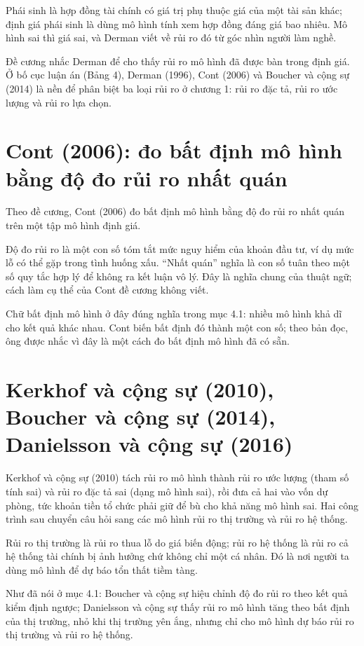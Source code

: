 Phái sinh là hợp đồng tài chính có giá trị phụ thuộc giá của một tài sản khác; định giá phái sinh là dùng mô hình tính xem hợp đồng đáng giá bao nhiêu. Mô hình sai thì giá sai, và Derman viết về rủi ro đó từ góc nhìn người làm nghề.

Đề cương nhắc Derman để cho thấy rủi ro mô hình đã được bàn trong định giá. Ở bố cục luận án (Bảng 4), Derman (1996), Cont (2006) và Boucher và cộng sự (2014) là nền để phân biệt ba loại rủi ro ở chương 1: rủi ro đặc tả, rủi ro ước lượng và rủi ro lựa chọn.

\section{Cont (2006): đo bất định mô hình bằng độ đo rủi ro nhất quán}

Theo đề cương, Cont (2006) đo bất định mô hình bằng độ đo rủi ro nhất quán trên một tập mô hình định giá.

Độ đo rủi ro là một con số tóm tắt mức nguy hiểm của khoản đầu tư, ví dụ mức lỗ có thể gặp trong tình huống xấu. “Nhất quán” nghĩa là con số tuân theo một số quy tắc hợp lý để không ra kết luận vô lý. Đây là nghĩa chung của thuật ngữ; cách làm cụ thể của Cont đề cương không viết.

Chữ bất định mô hình ở đây đúng nghĩa trong mục 4.1: nhiều mô hình khả dĩ cho kết quả khác nhau. Cont biến bất định đó thành một con số; theo bản đọc, ông được nhắc vì đây là một cách đo bất định mô hình đã có sẵn.

\section{Kerkhof và cộng sự (2010), Boucher và cộng sự (2014), Danielsson và cộng sự (2016)}

Kerkhof và cộng sự (2010) tách rủi ro mô hình thành rủi ro ước lượng (tham số tính sai) và rủi ro đặc tả sai (dạng mô hình sai), rồi đưa cả hai vào vốn dự phòng, tức khoản tiền tổ chức phải giữ để bù cho khả năng mô hình sai. Hai công trình sau chuyển câu hỏi sang các mô hình rủi ro thị trường và rủi ro hệ thống.

Rủi ro thị trường là rủi ro thua lỗ do giá biến động; rủi ro hệ thống là rủi ro cả hệ thống tài chính bị ảnh hưởng chứ không chỉ một cá nhân. Đó là nơi người ta dùng mô hình để dự báo tổn thất tiềm tàng.

Như đã nói ở mục 4.1: Boucher và cộng sự hiệu chỉnh độ đo rủi ro theo kết quả kiểm định ngược; Danielsson và cộng sự thấy rủi ro mô hình tăng theo bất định của thị trường, nhỏ khi thị trường yên ắng, nhưng chỉ cho mô hình dự báo rủi ro thị trường và rủi ro hệ thống.


